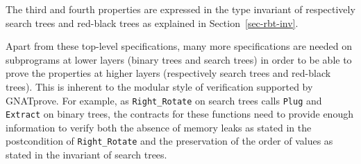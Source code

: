 \documentclass{llncs}
\newcommand{\gnatprove}{GNATprove\xspace}
\begin{document}
The third and fourth properties are expressed in the type invariant of
respectively search trees and red-black trees as explained in
Section~\ref{sec-rbt-inv}.

Apart from these top-level specifications, many more specifications are needed
on subprograms at lower layers (binary trees and search trees) in order to be
able to prove the properties at higher layers (respectively search trees and
red-black trees). This is inherent to the modular style of verification
supported by \gnatprove. For example, as \texttt{Right\_Rotate} on search trees
calls \texttt{Plug} and \texttt{Extract} on binary trees, the contracts for
these functions need to provide enough information to verify both the absence
of memory leaks as stated in the postcondition of \texttt{Right\_Rotate} and
the preservation of the order of values as stated in the invariant of search
trees.







\end{document}
